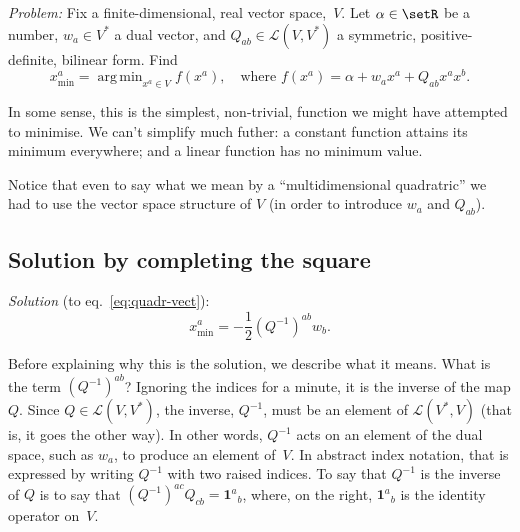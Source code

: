\documentclass[10pt, a4paper]{article}
\newcommand{\id}{\mathbold{1}}
\DeclareMathOperator*{\argmin}{arg\,min}
\begin{document}
\emph{Problem:} Fix a finite-dimensional, real vector space,~$V$. Let
$\alpha\in\setR$ be a number, $w_a\in V^*$ a dual vector, and
$Q_{ab} \in \mathcal{L}(V,V^*)$ a symmetric, positive-definite, bilinear
form. Find 
\begin{equation}
x^a_\text{min} = \argmin_{x^a\in V} f(x^a),\quad\text{where $f(x^a) = \alpha + w_ax^a + Q_{ab}x^ax^b$}.
\label{eq:quadr-vect}
\end{equation}

In some sense, this is the simplest, non-trivial, function we might
have attempted to minimise. We can't simplify much futher: a constant
function attains its minimum everywhere; and a linear function has no
minimum value.

Notice that even to say what we mean by a “multidimensional
quadratric” we had to use the vector space structure of $V$ (in order
to introduce $w_a$ and $Q_{ab}$).

\subsection{Solution by completing the square}

\emph{Solution} (to eq.~\eqref{eq:quadr-vect}):
\begin{equation}
  x^a_\text{min} = -\frac{1}{2} {(Q^{-1})}^{ab}w_b.
\label{eq:sol-quadr-vect}
\end{equation}

Before explaining why this is the solution, we describe what it
means. What is the term ${(Q^{-1})}^{ab}$? Ignoring the indices for a
minute, it is the inverse of the map $Q$. Since
$Q\in\mathcal{L}(V, V^*)$, the inverse, $Q^{-1}$, must be an element of
$\mathcal{L}(V^*, V)$ (that is, it goes the other way). In other words,
$Q^{-1}$ acts on an element of the dual space, such as $w_a$, to
produce an element of~$V$. In abstract index notation, that is
expressed by writing $Q^{-1}$ with two raised indices. To say that
$Q^{-1}$ is the inverse of $Q$ is to say that
${(Q^{-1})}^{ac}Q_{cb} = \id^a{}_b$, where, on the right, $\id^a{}_b$
is the identity operator on~$V$.
\end{document}

